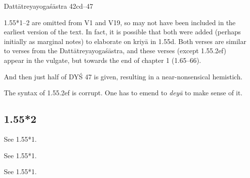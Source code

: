 \begin{ekdosis}
\begin{sources}[hp01_055_1]
Dattātreyayogaśāstra 42cd--47

\begin{versinnote}
\end{versinnote}

\end{sources}

\begin{testimonia}[hp01_055_1]
\end{testimonia}

\begin{philcomm}[hp01_055_1]
1.55*1–2 are omitted from V1 and V19, so may not have been included in the earliest version of the text. In fact, it is possible that both were added (perhaps initially as marginal notes) to elaborate on kriyā in 1.55d. Both verses are similar to verses from the Dattātreyayogaśāstra, and these verses (except 1.55.2ef) appear in the vulgate, but towards the end of chapter 1 (1.65–66).

And then just half of DYŚ 47 is given, resulting in a near-nonsensical hemistich.

The syntax of 1.55.2ef is corrupt. One has to emend to \emph{deyā} to make sense of it.
\end{philcomm}

\subsection*{1.55*2}
\begin{sources}[hp01_055_2]
See 1.55*1.
\end{sources}

\begin{testimonia}[hp01_055_2]
See 1.55*1.
\end{testimonia}

\begin{philcomm}[hp01_055_2]
See 1.55*1.
\end{philcomm}


\end{ekdosis}
